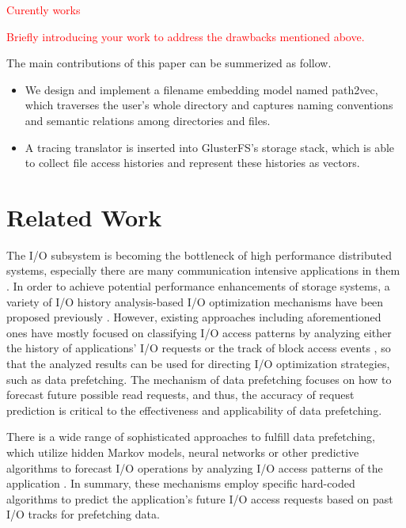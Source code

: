 \documentclass[conference]{IEEEtran}
\begin{document}
\textcolor{red}{Curently works}




\textcolor{red}{Briefly introducing your work to address the drawbacks mentioned above.}

The main contributions of this paper can be summerized as follow.
\begin{itemize}
    \item We design and implement a filename embedding model named path2vec, 
    which traverses the user's whole directory and captures naming conventions and semantic relations among directories and files.
    \item A tracing translator is inserted into GlusterFS's storage stack, which is able to collect file access histories and represent these histories as vectors.

\end{itemize}

\section{Related Work}
The I/O subsystem is becoming the bottleneck of high performance distributed systems, 
especially there are many communication intensive applications in them \cite{Related_Network_I/O_load_based}.
In order to achieve potential performance enhancements of storage systems, 
a variety of I/O history analysis-based I/O optimization mechanisms have been proposed previously 
\cite{Related_Multi_Layer_Event_Trace_Analysis} \cite{Related_Towards_an_I/O_tracing_framework_taxonomy} \cite{Related_DiskSeen} \cite{A_Prefetching_Scheme_Related} \cite{Scalable_IO_Tracing_Related}.
However, existing approaches including aforementioned ones have mostly focused on classifying I/O access patterns by analyzing either the history of applications’ I/O requests
\cite{Parallel_IO_Prefetching_Related} \cite{Learning_To_Classify_Related}
or the track of block access events \cite{Related_DiskSeen} \cite{A_Prefetching_Scheme_Related}, 
so that the analyzed results can be used for directing I/O optimization strategies, such as data prefetching.
The mechanism of data prefetching focuses on how to forecast future possible read requests, and thus, 
the accuracy of request prediction is critical to the effectiveness and applicability of data prefetching.

There is a wide range of sophisticated approaches to fulﬁll data prefetching, 
which utilize hidden Markov models, 
neural networks or other predictive algorithms to forecast I/O operations by analyzing I/O access patterns of the application 
\cite{Parallel_IO_Prefetching_Related} \cite{IO_Acceleration_with_Related} \cite{An_Automatic_Prefetching_Related} \cite{Reducing_File_System_Latency_Related} \cite{Automatic_ARIMA_Related}.
In summary, these mechanisms employ specific hard-coded algorithms to predict the application's future I/O access requests based on past I/O tracks for prefetching data.
\end{document}
